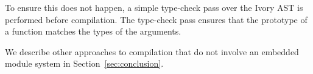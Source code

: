 To ensure this does not happen, a simple type-check pass over the Ivory AST is
performed before compilation. The type-check pass ensures that the prototype of
a function matches the types of the arguments.

We describe other approaches to compilation that do not involve an embedded
module system in Section~\ref{sec:conclusion}.
